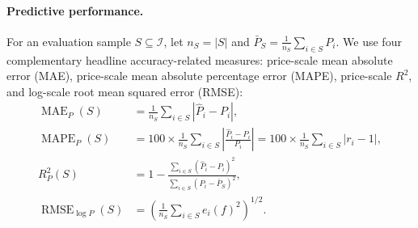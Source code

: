 \documentclass[10pt]{article}
\theoremstyle{definition}
\newcommand{\1}{\mathbf{1}}
\begin{document}
\paragraph{Predictive performance.}
{For an evaluation sample $S\subseteq\mathcal{I}$, let $n_S=|S|$ and $\bar P_S=\frac{1}{n_S}\sum_{i\in S}P_i$. We use four complementary headline accuracy-related measures: price-scale mean absolute error (MAE), price-scale mean absolute percentage error (MAPE), price-scale $R^2$, and log-scale root mean squared error (RMSE):}
\begin{align}
\label{eq:predictive_metrics}
\operatorname{MAE}_{P}(S)
&=
\frac{1}{n_S}\sum_{i\in S}\left|\widehat P_i-P_i\right|,
\\
{\operatorname{MAPE}_{P}(S)}
&{=100\times
\frac{1}{n_S}
\sum_{i\in S}
\left|
\frac{\widehat P_i-P_i}{P_i}
\right|
=100\times 
\frac{1}{n_S}\sum_{i\in S}|r_i-1|},
\\
R^2_{P}(S)
&=
1-
\frac{\sum_{i\in S}(\widehat P_i-P_i)^2}
{\sum_{i\in S}(P_i-\bar P_S)^2},
\\
\operatorname{RMSE}_{\log P}(S)
&=
\left(
\frac{1}{n_S}\sum_{i\in S}e_i(f)^2
\right)^{1/2}.
\end{align}

\end{document}
